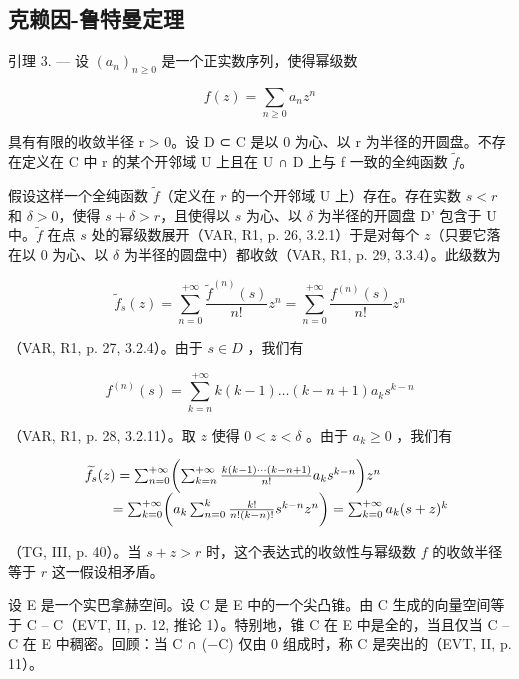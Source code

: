 \subsection{克赖因-鲁特曼定理}

引理 3. --- 设 \((a_n)_{n \geqslant 0}\) 是一个正实数序列，使得幂级数

\[
f (z) = \sum_ {n \geqslant 0} a _ {n} z ^ {n}
\]

具有有限的收敛半径 r \textgreater{} 0。设 D ⊂ C 是以 0 为心、以 r 为半径的开圆盘。不存在定义在 C 中 r 的某个开邻域 U 上且在 U ∩ D 上与 f 一致的全纯函数 \(\widetilde{f}\)。

假设这样一个全纯函数 \(\tilde{f}\)（定义在 \(r\) 的一个开邻域 U 上）存在。存在实数 \(s < r\) 和 \(\delta > 0\)，使得 \(s + \delta > r\)，且使得以 \(s\) 为心、以 \(\delta\) 为半径的开圆盘 D' 包含于 U 中。\(\tilde{f}\) 在点 \(s\) 处的幂级数展开（VAR, R1, p. 26, 3.2.1）于是对每个 \(z\)（只要它落在以 0 为心、以 \(\delta\) 为半径的圆盘中）都收敛（VAR, R1, p. 29, 3.3.4）。此级数为

\[
\widetilde {f} _ {s} (z) = \sum_ {n = 0} ^ {+ \infty} \frac {\widetilde {f} ^ {(n)} (s)}{n !} z ^ {n} = \sum_ {n = 0} ^ {+ \infty} \frac {f ^ {(n)} (s)}{n !} z ^ {n}
\]

（VAR, R1, p. 27, 3.2.4）。由于 \(s \in D\) ，我们有

\[
f ^ {(n)} (s) = \sum_ {k = n} ^ {+ \infty} k (k - 1) \dots (k - n + 1) a _ {k} s ^ {k - n}
\]

（VAR, R1, p. 28, 3.2.11）。取 \(z\) 使得 \(0 < z < \delta\) 。由于 \(a_{k} \geqslant 0\) ，我们有

\[
\begin{array}{r l} & {\widetilde {f} _ {s} (z) = \sum_ {n = 0} ^ {+ \infty} \biggl (\sum_ {k = n} ^ {+ \infty} \frac {k (k - 1) \cdots (k - n + 1)}{n !} a _ {k} s ^ {k - n} \biggr) z ^ {n}} \\ & {\qquad = \sum_ {k = 0} ^ {+ \infty} \biggl (a _ {k} \sum_ {n = 0} ^ {k} \frac {k !}{n ! (k - n) !} s ^ {k - n} z ^ {n} \biggr) = \sum_ {k = 0} ^ {+ \infty} a _ {k} (s + z) ^ {k}} \end{array}
\]

（TG, III, p. 40）。当 \(s + z > r\) 时，这个表达式的收敛性与幂级数 \(f\) 的收敛半径等于 \(r\) 这一假设相矛盾。

设 E 是一个实巴拿赫空间。设 C 是 E 中的一个尖凸锥。由 C 生成的向量空间等于 C -- C（EVT, II, p. 12, 推论 1）。特别地，锥 C 在 E 中是全的，当且仅当 C -- C 在 E 中稠密。回顾：当 C ∩ (−C) 仅由 0 组成时，称 C 是突出的（EVT, II, p. 11）。

